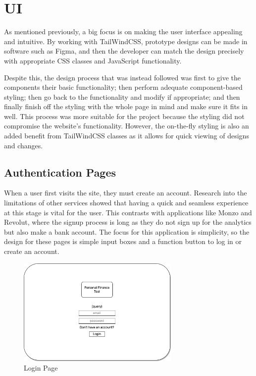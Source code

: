 \section{UI}
\label{sec:ui}
As mentioned previously, a big focus is on making the user interface appealing and intuitive. By working with TailWindCSS, prototype designs can be made in software such as Figma, and then the developer can match the design precisely with appropriate CSS classes and JavaScript functionality.

Despite this, the design process that was instead followed was first to give the components their basic functionality; then perform adequate component-based styling; then go back to the functionality and modify if appropriate; and then finally finish off the styling with the whole page in mind and make sure it fits in well. This process was more suitable for the project because the styling did not compromise the website's functionality. However, the on-the-fly styling is also an added benefit from TailWindCSS classes as it allows for quick viewing of designs and changes.

\subsection{Authentication Pages}
When a user first visits the site, they must create an account. Research into the limitations of other services showed that having a quick and seamless experience at this stage is vital for the user. This contrasts with applications like Monzo and Revolut, where the signup process is long as they do not sign up for the analytics but also make a bank account. The focus for this application is simplicity, so the design for these pages is simple input boxes and a function button to log in or create an account.

\begin{figure}[H]
	\centering
	\includegraphics[width=0.7\textwidth]{images/login_specification.png}
	\caption{Login Page}
	\label{fig:LoginPage}
\end{figure}

